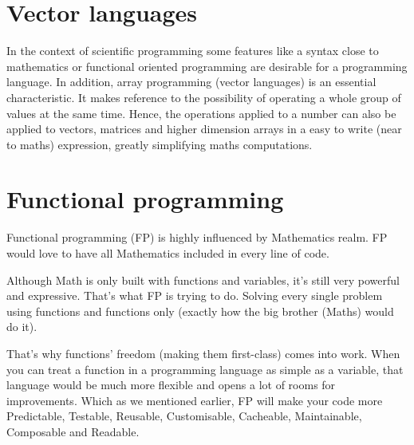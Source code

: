  
 
 
 
    \section{Vector languages}
 
 
In the context of scientific programming some features like a syntax close to mathematics or
functional oriented programming are desirable for a programming language. 
In addition, array programming (vector languages) is an essential characteristic. 
It makes reference to the possibility of operating a whole group of values at the same time.
Hence, the operations applied to a number can also be applied to vectors, matrices and higher dimension arrays
in a easy to write (near to maths) expression, greatly simplifying maths computations.
 
 
 
 
 
 
    \section{Functional programming} \label{sec:fpro}
 
Functional programming (FP) is highly influenced by Mathematics realm. 
FP would love to have all Mathematics included in every line of code.
 
Although Math is only built with functions and variables, it’s still very powerful and expressive. 
That’s what FP is trying to do. 
Solving every single problem using functions and functions only (exactly how the big brother (Maths) would do it).
 
That’s why functions’ freedom (making them first-class) comes into work. 
When you can treat a function in a programming language as simple as a variable, that language would be much more flexible and opens a lot of rooms for improvements. 
Which as we mentioned earlier, FP will make your code more Predictable, Testable, Reusable, Customisable, Cacheable, Maintainable, Composable and Readable.
 
 
 
 
 
 
 
 
 
% 
% 
